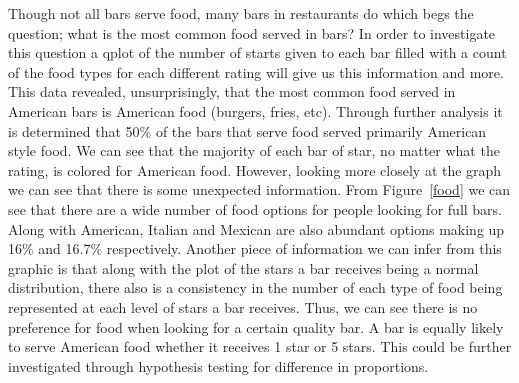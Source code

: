 \documentclass[11pt]{article}
\begin{document}
Though not all bars serve food, many bars in restaurants do which begs the question; what is the most common food served in bars?  In order to investigate this question a qplot of the number of starts given to each bar filled with a count of the food types for each different rating will give us this information and more.  This data revealed, unsurprisingly, that the most common food served in American bars is American food (burgers, fries, etc). Through further analysis it is determined that 50$\%$ of the bars that serve food served primarily American style food.  We can see that the majority of each bar of star, no matter what the rating, is colored for American food.  However, looking more closely at the graph we can see that there is some unexpected information.  From Figure~\ref{food} we can see that there are a wide number of food options for people looking for full bars.  Along with American, Italian and Mexican are also abundant options making up 16$\%$ and 16.7$\%$ respectively.  Another piece of information we can infer from this graphic is that along with the plot of the stars a bar receives being a normal distribution, there also is a consistency in the number of each type of food being represented at each level of stars a bar receives.  Thus, we can see there is no preference for food when looking for a certain quality bar. A bar is equally likely to serve American food whether it receives 1 star or 5 stars.  This could be further investigated through hypothesis testing for difference in proportions.
\end{document}
